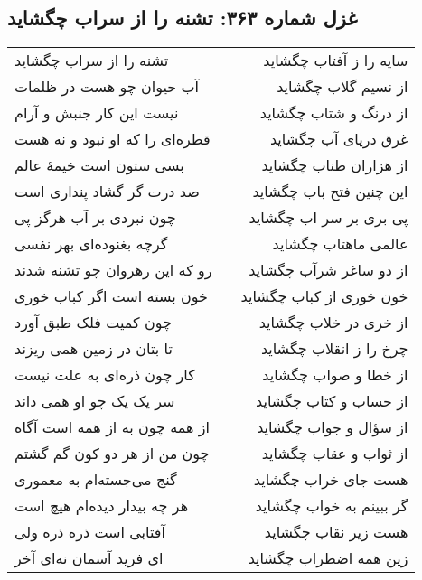 \begin{center}
\section*{غزل شماره ۳۶۳: تشنه را از سراب چگشاید}
\label{sec:363}
\begin{longtable}{l p{0.5cm} r}
تشنه را از سراب چگشاید
&&
سایه را ز آفتاب چگشاید
\\
آب حیوان چو هست در ظلمات
&&
از نسیم گلاب چگشاید
\\
نیست این کار جنبش و آرام
&&
از درنگ و شتاب چگشاید
\\
قطره‌ای را که او نبود و نه هست
&&
غرق دریای آب چگشاید
\\
بسی ستون است خیمهٔ عالم
&&
از هزاران طناب چگشاید
\\
صد درت گر گشاد پنداری است
&&
این چنین فتح باب چگشاید
\\
چون نبردی بر آب هرگز پی
&&
پی بری بر سر اب چگشاید
\\
گرچه بغنوده‌ای بهر نفسی
&&
عالمی ماهتاب چگشاید
\\
رو که این رهروان چو تشنه شدند
&&
از دو ساغر شرآب چگشاید
\\
خون بسته است اگر کباب خوری
&&
خون خوری از کباب چگشاید
\\
چون کمیت فلک طبق آورد
&&
از خری در خلاب چگشاید
\\
تا بتان در زمین همی ریزند
&&
چرخ را ز انقلاب چگشاید
\\
کار چون ذره‌ای به علت نیست
&&
از خطا و صواب چگشاید
\\
سر یک یک چو او همی داند
&&
از حساب و کتاب چگشاید
\\
از همه چون به از همه است آگاه
&&
از سؤال و جواب چگشاید
\\
چون من از هر دو کون گم گشتم
&&
از ثواب و عقاب چگشاید
\\
گنج می‌جسته‌ام به معموری
&&
هست جای خراب چگشاید
\\
هر چه بیدار دیده‌ام هیچ است
&&
گر ببینم به خواب چگشاید
\\
آفتابی است ذره ذره ولی
&&
هست زیر نقاب چگشاید
\\
ای فرید آسمان نه‌ای آخر
&&
زین همه اضطراب چگشاید
\\
\end{longtable}
\end{center}
